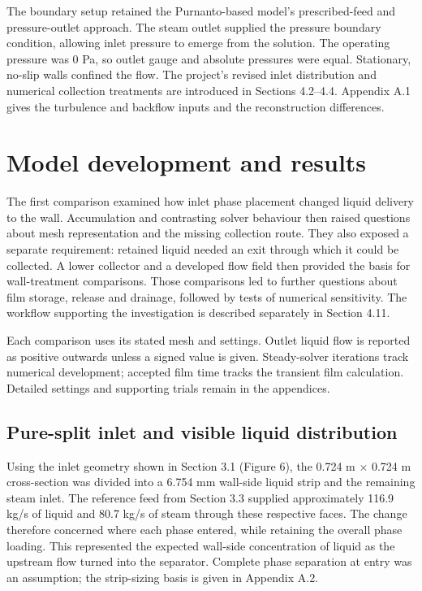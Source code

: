 \documentclass[12pt]{article}
\begin{document}
The boundary setup retained the Purnanto-based model's prescribed-feed and pressure-outlet approach. The steam outlet supplied the pressure boundary condition, allowing inlet pressure to emerge from the solution. The operating pressure was 0 Pa, so outlet gauge and absolute pressures were equal. Stationary, no-slip walls confined the flow. The project's revised inlet distribution and numerical collection treatments are introduced in Sections 4.2--4.4. Appendix A.1 gives the turbulence and backflow inputs and the reconstruction differences.

\section{Model development and results}\label{model-development-and-results}

The first comparison examined how inlet phase placement changed liquid delivery to the wall. Accumulation and contrasting solver behaviour then raised questions about mesh representation and the missing collection route. They also exposed a separate requirement: retained liquid needed an exit through which it could be collected. A lower collector and a developed flow field then provided the basis for wall-treatment comparisons. Those comparisons led to further questions about film storage, release and drainage, followed by tests of numerical sensitivity. The workflow supporting the investigation is described separately in Section 4.11.

Each comparison uses its stated mesh and settings. Outlet liquid flow is reported as positive outwards unless a signed value is given. Steady-solver iterations track numerical development; accepted film time tracks the transient film calculation. Detailed settings and supporting trials remain in the appendices.

\subsection{Pure-split inlet and visible liquid distribution}\label{pure-split-inlet-and-visible-liquid-distribution}

Using the inlet geometry shown in Section 3.1 (Figure 6), the 0.724 m × 0.724 m cross-section was divided into a 6.754 mm wall-side liquid strip and the remaining steam inlet. The reference feed from Section 3.3 supplied approximately 116.9 kg/s of liquid and 80.7 kg/s of steam through these respective faces. The change therefore concerned where each phase entered, while retaining the overall phase loading. This represented the expected wall-side concentration of liquid as the upstream flow turned into the separator. Complete phase separation at entry was an assumption; the strip-sizing basis is given in Appendix A.2.
\end{document}
